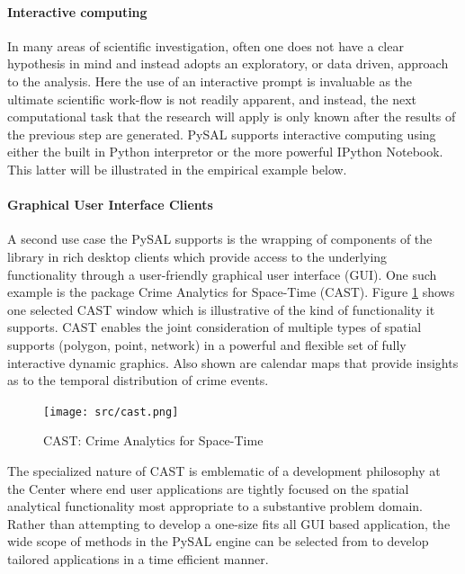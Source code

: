 \documentclass[11pt, titlepage]{article}
\begin{document}
\paragraph{Interactive computing}

In many areas of scientific investigation, often one does not have a
clear hypothesis in mind and instead adopts an exploratory, or data
driven, approach to the analysis. Here the use of an interactive prompt
is invaluable as the ultimate scientific work-flow is not readily
apparent, and instead, the next computational task that the research
will apply is only known after the results of the previous step are
generated. PySAL supports interactive computing using either the built
in Python interpretor or the more powerful IPython Notebook. This latter
will be illustrated in the empirical example below.

\paragraph{Graphical User Interface Clients}

A second use case the PySAL supports is the wrapping of components of
the library in rich desktop clients which provide access to the
underlying functionality through a user-friendly graphical user
interface (GUI). One such example is the package Crime Analytics for
Space-Time (CAST). Figure \ref{f:cast} shows one selected CAST window
which is illustrative of the kind of functionality it supports. CAST
enables the joint consideration of multiple types of spatial supports
(polygon, point, network) in a powerful and flexible set of fully
interactive dynamic graphics. Also shown are calendar maps that provide
insights as to the temporal distribution of crime events.

\begin{figure}[ht]
  \begin{center}
    \texttt{[image: src/cast.png]}
  \end{center}
     \caption{CAST: Crime Analytics for Space-Time}
     \label{f:cast}
      \end{figure}      

The specialized nature of CAST is emblematic of a development philosophy
at the Center where end user applications are tightly focused on the
spatial analytical functionality most appropriate to a substantive
problem domain. Rather than attempting to develop a one-size fits all
GUI based application, the wide scope of methods in the PySAL engine can
be selected from to develop tailored applications in a time efficient
manner.
\end{document}
